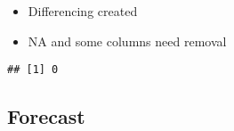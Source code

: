 \documentclass[
]{article}
\newenvironment{Shaded}{\begin{snugshade}}{\end{snugshade}}
\newcommand{\DecValTok}[1]{\textcolor[rgb]{0.00,0.00,0.81}{#1}}
\newcommand{\FunctionTok}[1]{\textcolor[rgb]{0.13,0.29,0.53}{\textbf{#1}}}
\newcommand{\NormalTok}[1]{#1}
\newcommand{\OtherTok}[1]{\textcolor[rgb]{0.56,0.35,0.01}{#1}}
\newcommand{\SpecialCharTok}[1]{\textcolor[rgb]{0.81,0.36,0.00}{\textbf{#1}}}
\providecommand{\tightlist}{%
  \setlength{\itemsep}{0pt}\setlength{\parskip}{0pt}}
\begin{document}
\begin{itemize}
\tightlist
\item
  Differencing created
\item
  NA and some columns need removal
\end{itemize}

\begin{Shaded}
\end{Shaded}

\begin{verbatim}
## [1] 0
\end{verbatim}

\hypertarget{forecast-3}{%
\subsection{Forecast}\label{forecast-3}}
\end{document}
